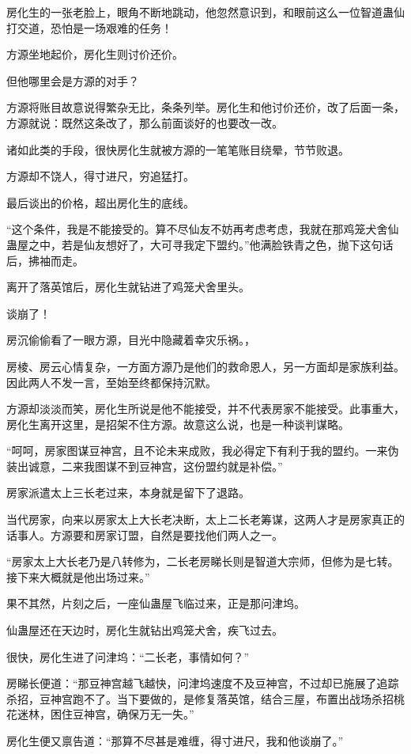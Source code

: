 \begin{this_body}
房化生的一张老脸上，眼角不断地跳动，他忽然意识到，和眼前这么一位智道蛊仙打交道，恐怕是一场艰难的任务！

方源坐地起价，房化生则讨价还价。

但他哪里会是方源的对手？

方源将账目故意说得繁杂无比，条条列举。房化生和他讨价还价，改了后面一条，方源就说：既然这条改了，那么前面谈好的也要改一改。

诸如此类的手段，很快房化生就被方源的一笔笔账目绕晕，节节败退。

方源却不饶人，得寸进尺，穷追猛打。

最后谈出的价格，超出房化生的底线。

“这个条件，我是不能接受的。算不尽仙友不妨再考虑考虑，我就在那鸡笼犬舍仙蛊屋之中，若是仙友想好了，大可寻我定下盟约。”他满脸铁青之色，抛下这句话后，拂袖而走。

离开了落英馆后，房化生就钻进了鸡笼犬舍里头。

谈崩了！

房沉偷偷看了一眼方源，目光中隐藏着幸灾乐祸。，

房棱、房云心情复杂，一方面方源乃是他们的救命恩人，另一方面却是家族利益。因此两人不发一言，至始至终都保持沉默。

方源却淡淡而笑，房化生所说是他不能接受，并不代表房家不能接受。此事重大，房化生离开这里，是招架不住方源。故意这么说，也是一种谈判谋略。

“呵呵，房家图谋豆神宫，且不论未来成败，我必得定下有利于我的盟约。一来伪装出诚意，二来我图谋不到豆神宫，这份盟约就是补偿。”

房家派遣太上三长老过来，本身就是留下了退路。

当代房家，向来以房家太上大长老决断，太上二长老筹谋，这两人才是房家真正的话事人。方源要和房家订盟，自然是要找他们两人之一。

“房家太上大长老乃是八转修为，二长老房睇长则是智道大宗师，但修为是七转。接下来大概就是他出场过来。”

果不其然，片刻之后，一座仙蛊屋飞临过来，正是那问津坞。

仙蛊屋还在天边时，房化生就钻出鸡笼犬舍，疾飞过去。

很快，房化生进了问津坞：“二长老，事情如何？”

房睇长便道：“那豆神宫越飞越快，问津坞速度不及豆神宫，不过却已施展了追踪杀招，豆神宫跑不了。当下要做的，是修复落英馆，结合三屋，布置出战场杀招桃花迷林，困住豆神宫，确保万无一失。”

房化生便又禀告道：“那算不尽甚是难缠，得寸进尺，我和他谈崩了。”


\end{this_body}
